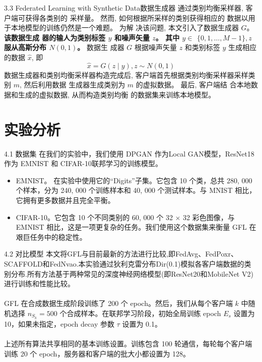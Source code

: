 \documentclass{sintefbeamer}
\theoremstyle{definition}
\begin{document}
\begin{frame}{3.3 Federated Learning with Synthetic Data}{数据生成器}
通过类别均衡采样器, 客户端可获得各类别的 采样量。 然而, 如何根据所采样的类别获得相应的 数据以用于本地模型的训练仍然是一个难题。 为解 决该问题, 本文引入了数据生成器 $G$。\textbf{该数据生成 器的输人为类别标签 $y$ 和噪声矢量 $z$。 其中 $y \in$ $\{0,1, \ldots, M-1\}, z$ 服从高斯分布 $N(0,1)$。}  数据生 成器 $G$ 根据噪声矢量 $z$ 和类别标签 $y$ 生成相应的数据 $\hat{x}$, 即
$$
\hat{x}=G(z \mid y), z \sim N(0,1) 
$$
数据生成器和类别均衡采样器构造完成后, 客户端首先根据类别均衡采样器采样类别 $m$, 然后利用数据 生成器生成类别为 $m$ 的虚拟数据。 最后, 客户端结 合本地数据和生成的虚拟数据, 从而构造类别均衡 的数据集来训练本地模型。
\end{frame}





\section{实验分析}

\begin{frame}{4.1 数据集}
在我们的实验中，我们使用 DPGAN 作为Local GAN模型，ResNet18 作为 EMNIST 和 CIFAR-10联邦学习的训练模型。

	\begin{itemize}
\item[1)] EMNIST。 在实验中使用它的“Digits”子集。它包含 10 个类，总共 280, 000 个样本，分为 240, 000 个训练样本和 40, 000 个测试样本。与 MNIST 相比，它拥有更多数据并且完全平衡。
\item[2)] CIFAR-10。它包含 10 个不同类别的 60, 000 个 32 × 32 彩色图像，与 EMNIST 相比，这是一项更复杂的任务。我们使用这个数据集来衡量 GFL 在艰巨任务中的稳定性。
\end{itemize}
\end{frame}

\begin{frame}{4.2 对比模型}
本文将GFL与目前最新的方法进行比较,即FedAvg、FedPoxr、SCAFFOLD和FedNvao.本实验通过狄利克雷分布Dir(0.1)模拟各客户端数据的类别分布.所有方法基于两种常见的深度神经网络模型(即ResNet20和MobileNet V2)进行训练和性能比较。
	\\ \hspace*{\fill} \\
GFL 在合成数据生成阶段训练了 200 个 epoch。然后，我们从每个客户端 $k$ 中随机选择 $n_{S_k}=500$  个合成样本。在联邦学习阶段，初始全局训练 epoch $E_s$ 设置为 10，如果未指定，epoch decay 参数 $\tau$ 设置为 0.1。
	\\ \hspace*{\fill} \\
上述所有算法共享相同的基本训练设置。训练包含 100 轮通信，每轮每个客户端训练 20 个 epoch，服务器和客户端的批大小都设置为 128。
\end{frame}
\end{document}
